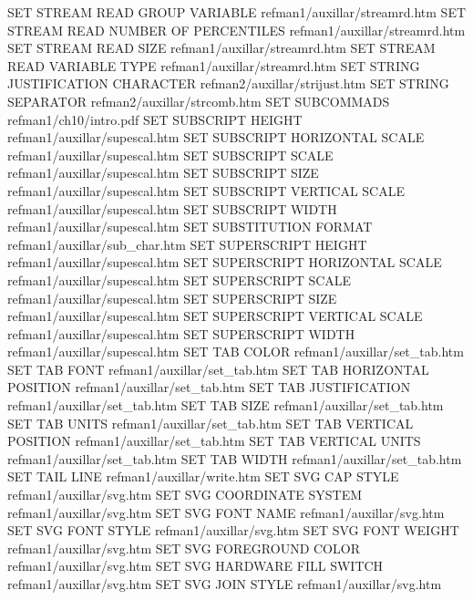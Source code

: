SET STREAM READ GROUP VARIABLE          refman1/auxillar/streamrd.htm
SET STREAM READ NUMBER OF PERCENTILES   refman1/auxillar/streamrd.htm
SET STREAM READ SIZE                    refman1/auxillar/streamrd.htm
SET STREAM READ VARIABLE TYPE           refman1/auxillar/streamrd.htm
SET STRING JUSTIFICATION CHARACTER      refman2/auxillar/strijust.htm
SET STRING SEPARATOR                    refman2/auxillar/strcomb.htm
SET SUBCOMMADS                          refman1/ch10/intro.pdf
SET SUBSCRIPT HEIGHT                    refman1/auxillar/supescal.htm
SET SUBSCRIPT HORIZONTAL SCALE          refman1/auxillar/supescal.htm
SET SUBSCRIPT SCALE                     refman1/auxillar/supescal.htm
SET SUBSCRIPT SIZE                      refman1/auxillar/supescal.htm
SET SUBSCRIPT VERTICAL SCALE            refman1/auxillar/supescal.htm
SET SUBSCRIPT WIDTH                     refman1/auxillar/supescal.htm
SET SUBSTITUTION FORMAT                 refman1/auxillar/sub_char.htm
SET SUPERSCRIPT HEIGHT                  refman1/auxillar/supescal.htm
SET SUPERSCRIPT HORIZONTAL SCALE        refman1/auxillar/supescal.htm
SET SUPERSCRIPT SCALE                   refman1/auxillar/supescal.htm
SET SUPERSCRIPT SIZE                    refman1/auxillar/supescal.htm
SET SUPERSCRIPT VERTICAL SCALE          refman1/auxillar/supescal.htm
SET SUPERSCRIPT WIDTH                   refman1/auxillar/supescal.htm
SET TAB COLOR                           refman1/auxillar/set_tab.htm
SET TAB FONT                            refman1/auxillar/set_tab.htm
SET TAB HORIZONTAL POSITION             refman1/auxillar/set_tab.htm
SET TAB JUSTIFICATION                   refman1/auxillar/set_tab.htm
SET TAB SIZE                            refman1/auxillar/set_tab.htm
SET TAB UNITS                           refman1/auxillar/set_tab.htm
SET TAB VERTICAL POSITION               refman1/auxillar/set_tab.htm
SET TAB VERTICAL UNITS                  refman1/auxillar/set_tab.htm
SET TAB WIDTH                           refman1/auxillar/set_tab.htm
SET TAIL LINE                           refman1/auxillar/write.htm
SET SVG CAP STYLE                       refman1/auxillar/svg.htm
SET SVG COORDINATE SYSTEM               refman1/auxillar/svg.htm
SET SVG FONT NAME                       refman1/auxillar/svg.htm
SET SVG FONT STYLE                      refman1/auxillar/svg.htm
SET SVG FONT WEIGHT                     refman1/auxillar/svg.htm
SET SVG FOREGROUND COLOR                refman1/auxillar/svg.htm
SET SVG HARDWARE FILL SWITCH            refman1/auxillar/svg.htm
SET SVG JOIN STYLE                      refman1/auxillar/svg.htm
